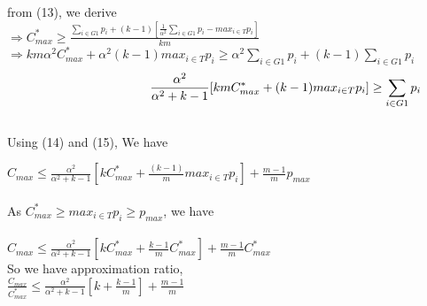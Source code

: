 \documentclass[10pt, conference, compsocconf]{IEEEtran}
\begin{document}
from (13), we derive\\
\hspace*{90pt}$\Rightarrow C_{max}^{*} \geq  \frac{\sum_{i \in G1 }^{}{{p_{i}}}+ (k-1)[\frac{1}{\alpha^{2}}\sum_{i \in G1 }^{}{{p_{i}}}-  {max_{i \in T}}{{p_{i}}}]}{km}$\\

\hspace*{90pt}$\Rightarrow km\alpha^{2}C_{max}^{*} + \alpha^{2} (k-1){max_{i \in T}}{{p_{i}}} \geq  \alpha^{2}\sum_{i \in G1 }^{}{{p_{i}}}+ (k-1)\sum_{i \in G1 }^{}{{p_{i}}} $\\



\begin{equation}
\hspace*{90pt}\frac{\alpha^{2}}{\alpha^{2}+k-1}[km C_{max}^{*}+(k-1) {max_{i \in T}}{{p_{i}}}] \geq \sum_{i \in G1 }^{}{{p_{i}}}  
\end{equation}
\\
Using (14) and (15), We have

\hspace*{90pt} $C_{max} \leq \frac{\alpha^{2}}{\alpha^{2}+k-1}[k C_{max}^{*}+\frac{(k-1)}{m} {max_{i \in T}}{{p_{i}}}] + {\frac{m-1}{m}} p_{max} $ \\
\\
 As $C_{max}^{*}\geq {{max_{i \in T}}{p_{i}}}\geq p_{max}$, we have\\
\\
 \hspace*{90pt} $C_{max} \leq \frac{\alpha^{2}}{\alpha^{2}+k-1}[k C_{max}^{*}+ {\frac{k-1}{m}}{C_{max}^{*}}] + {\frac{m-1}{m}} C_{max}^{*} $ \\
 

 
 So we have approximation ratio,\\
\hspace*{90pt} $\frac{C_{max}}{C_{max}^{*}} \leq \frac{\alpha^{2}}{\alpha^{2}+k-1}[k+ {\frac{k-1}{m}} ]+ {\frac{m-1}{m}}  $ \\    







%
%
\end{document}

